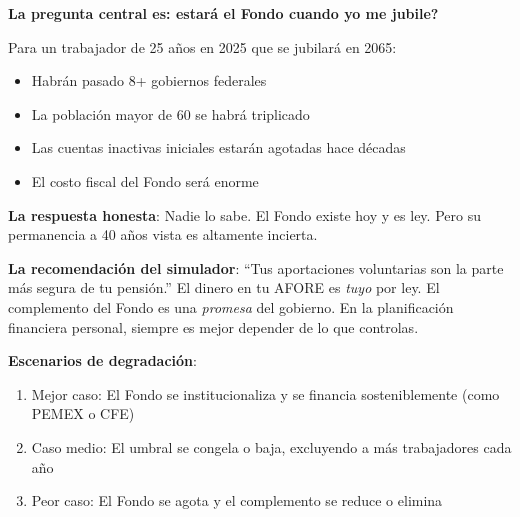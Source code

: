 \documentclass[11pt,a4paper]{report}
\begin{document}
\begin{tcolorbox}[colback=green!5!white, colframe=green!50!black, title=\textbf{Intuici\'on}]
\textbf{La pregunta central es: estar\'a el Fondo cuando yo me jubile?}

Para un trabajador de 25 a\~nos en 2025 que se jubilar\'a en 2065:
\begin{itemize}[nosep]
\item Habr\'an pasado 8+ gobiernos federales
\item La poblaci\'on mayor de 60 se habr\'a triplicado
\item Las cuentas inactivas iniciales estar\'an agotadas hace d\'ecadas
\item El costo fiscal del Fondo ser\'a enorme
\end{itemize}

\textbf{La respuesta honesta}: Nadie lo sabe. El Fondo existe hoy y es ley. Pero su permanencia a 40 a\~nos vista es altamente incierta.

\textbf{La recomendaci\'on del simulador}: ``Tus aportaciones voluntarias son la parte m\'as segura de tu pensi\'on.'' El dinero en tu AFORE es \emph{tuyo} por ley. El complemento del Fondo es una \emph{promesa} del gobierno. En la planificaci\'on financiera personal, siempre es mejor depender de lo que controlas.

\textbf{Escenarios de degradaci\'on}:
\begin{enumerate}[nosep]
\item Mejor caso: El Fondo se institucionaliza y se financia sosteniblemente (como PEMEX o CFE)
\item Caso medio: El umbral se congela o baja, excluyendo a m\'as trabajadores cada a\~no
\item Peor caso: El Fondo se agota y el complemento se reduce o elimina
\end{enumerate}
\end{tcolorbox}
\end{document}
